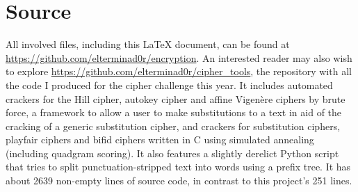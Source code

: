 \documentclass[fleqn,a4paper,11pt]{article}
\begin{document}
    \section{Source} All involved files, including this \LaTeX{} document, can
    be found at \url{https://github.com/elterminad0r/encryption}. An
    interested reader may also wish to explore
    \url{https://github.com/elterminad0r/cipher_tools}, the repository with
    all the code I produced for the cipher challenge this year. It includes
    automated crackers for the Hill cipher, autokey cipher and affine
    Vigen\`ere ciphers by brute force, a framework to allow a user to make
    substitutions to a text in aid of the cracking of a generic substitution
    cipher, and crackers for substitution ciphers, playfair ciphers and bifid
    ciphers written in C using simulated annealing (including quadgram
    scoring). It also features a slightly derelict Python script that tries to
    split punctuation-stripped text into words using a prefix tree. It has
    about 2639 non-empty lines of source code, in contrast to this project's
    251 lines.
\end{document}
